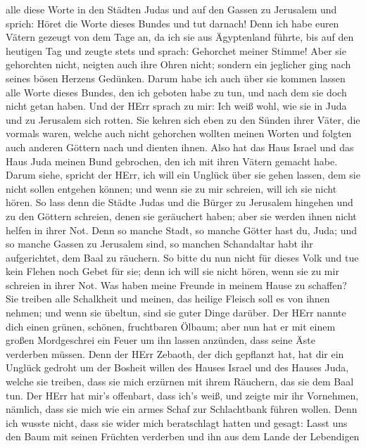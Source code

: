 alle diese Worte in den Städten Judas und auf den Gassen zu Jerusalem
und sprich: Höret die Worte dieses Bundes und tut darnach! 
Denn ich habe euren Vätern gezeugt von dem Tage an, da ich sie aus
Ägyptenland führte, bis auf den heutigen Tag und zeugte stets und
sprach: Gehorchet meiner Stimme!  Aber sie gehorchten nicht,
neigten auch ihre Ohren nicht; sondern ein jeglicher ging nach seines
bösen Herzens Gedünken. Darum habe ich auch über sie kommen lassen alle
Worte dieses Bundes, den ich geboten habe zu tun, und nach dem sie doch
nicht getan haben.  Und der HErr sprach zu mir: Ich weiß
wohl, wie sie in Juda und zu Jerusalem sich rotten.  Sie
kehren sich eben zu den Sünden ihrer Väter, die vormals waren, welche
auch nicht gehorchen wollten meinen Worten und folgten auch anderen
Göttern nach und dienten ihnen. Also hat das Haus Israel und das Haus
Juda meinen Bund gebrochen, den ich mit ihren Vätern gemacht habe.
 Darum siehe, spricht der HErr, ich will ein Unglück über
sie gehen lassen, dem sie nicht sollen entgehen können; und wenn sie zu
mir schreien, will ich sie nicht hören.  So lass denn die
Städte Judas und die Bürger zu Jerusalem hingehen und zu den Göttern
schreien, denen sie geräuchert haben; aber sie werden ihnen nicht helfen
in ihrer Not.  Denn so manche Stadt, so manche Götter hast
du, Juda; und so manche Gassen zu Jerusalem sind, so manchen Schandaltar
habt ihr aufgerichtet, dem Baal zu räuchern.  So bitte du
nun nicht für dieses Volk und tue kein Flehen noch Gebet für sie; denn
ich will sie nicht hören, wenn sie zu mir schreien in ihrer Not.
 Was haben meine Freunde in meinem Hause zu schaffen? Sie
treiben alle Schalkheit und meinen, das heilige Fleisch soll es von
ihnen nehmen; und wenn sie übeltun, sind sie guter Dinge darüber.
 Der HErr nannte dich einen grünen, schönen, fruchtbaren
Ölbaum; aber nun hat er mit einem großen Mordgeschrei ein Feuer um ihn
lassen anzünden, dass seine Äste verderben müssen.  Denn
der HErr Zebaoth, der dich gepflanzt hat, hat dir ein Unglück gedroht um
der Bosheit willen des Hauses Israel und des Hauses Juda, welche sie
treiben, dass sie mich erzürnen mit ihrem Räuchern, das sie dem Baal
tun.  Der HErr hat mir's offenbart, dass ich's weiß, und
zeigte mir ihr Vornehmen,  nämlich, dass sie mich wie ein
armes Schaf zur Schlachtbank führen wollen. Denn ich wusste nicht, dass
sie wider mich beratschlagt hatten und gesagt: Lasst uns den Baum mit
seinen Früchten verderben und ihn aus dem Lande der Lebendigen
